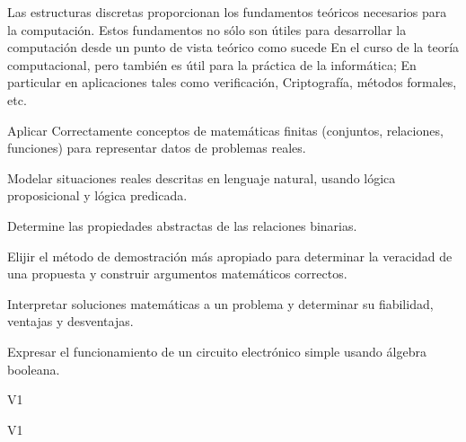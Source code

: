 \begin{syllabus}


\begin{justification}

Las estructuras discretas proporcionan los fundamentos teóricos necesarios para la computación. Estos fundamentos no sólo son útiles para desarrollar la computación desde un punto de vista teórico como sucede
En el curso de la teoría computacional, pero también es útil para la práctica de la informática; En particular en aplicaciones tales como verificación,
Criptografía, métodos formales, etc.

\end{justification}

\begin{goals}
\item Aplicar Correctamente conceptos de matemáticas finitas (conjuntos, relaciones, funciones) para representar datos de problemas reales.
\item Modelar situaciones reales descritas en lenguaje natural, usando lógica proposicional y lógica predicada.
\item Determine las propiedades abstractas de las relaciones binarias.
\item Elijir el método de demostración más apropiado para determinar la veracidad de una propuesta y construir argumentos matemáticos correctos.
\item Interpretar soluciones matemáticas a un problema y determinar su fiabilidad, ventajas y desventajas.
\item Expresar el funcionamiento de un circuito electrónico simple usando álgebra booleana.
\end{goals}

\begin{outcomes}{V1}
    \item {}
    \item {}
    \item {}
\end{outcomes}

\begin{competences}{V1}
    \item {}
    \item {}
\end{competences}


\end{syllabus}

